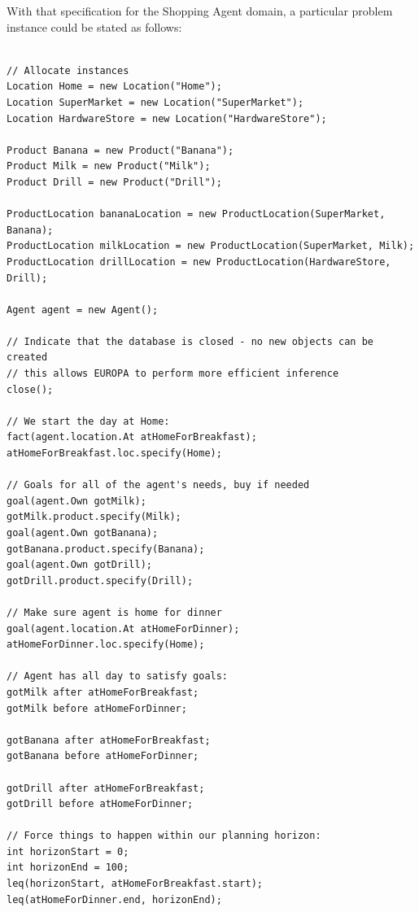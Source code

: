 With that specification for the Shopping Agent domain, a particular
problem instance could be stated as follows:

\begin{verbatim}

// Allocate instances
Location Home = new Location("Home");
Location SuperMarket = new Location("SuperMarket");
Location HardwareStore = new Location("HardwareStore");

Product Banana = new Product("Banana");
Product Milk = new Product("Milk");
Product Drill = new Product("Drill");

ProductLocation bananaLocation = new ProductLocation(SuperMarket, Banana);
ProductLocation milkLocation = new ProductLocation(SuperMarket, Milk);
ProductLocation drillLocation = new ProductLocation(HardwareStore, Drill);

Agent agent = new Agent();

// Indicate that the database is closed - no new objects can be created
// this allows EUROPA to perform more efficient inference
close();

// We start the day at Home:
fact(agent.location.At atHomeForBreakfast);
atHomeForBreakfast.loc.specify(Home);

// Goals for all of the agent's needs, buy if needed
goal(agent.Own gotMilk);
gotMilk.product.specify(Milk);
goal(agent.Own gotBanana);
gotBanana.product.specify(Banana);
goal(agent.Own gotDrill);
gotDrill.product.specify(Drill);

// Make sure agent is home for dinner
goal(agent.location.At atHomeForDinner);
atHomeForDinner.loc.specify(Home);

// Agent has all day to satisfy goals:
gotMilk after atHomeForBreakfast;
gotMilk before atHomeForDinner;

gotBanana after atHomeForBreakfast;
gotBanana before atHomeForDinner;

gotDrill after atHomeForBreakfast;
gotDrill before atHomeForDinner;

// Force things to happen within our planning horizon:
int horizonStart = 0;
int horizonEnd = 100;
leq(horizonStart, atHomeForBreakfast.start);
leq(atHomeForDinner.end, horizonEnd);

\end{verbatim}

